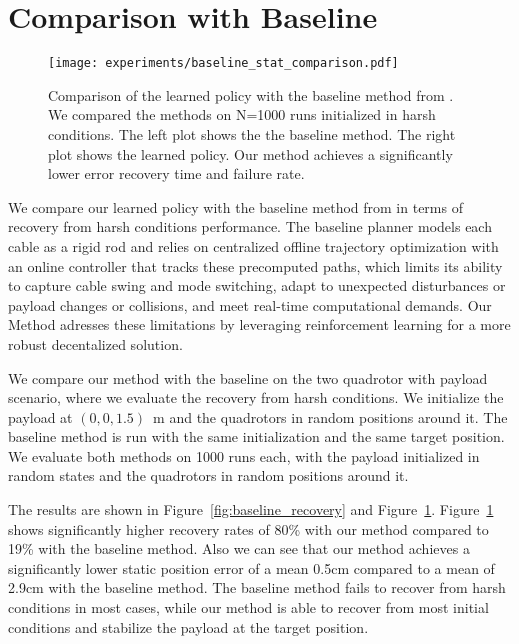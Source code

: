 \section{Comparison with Baseline}
\begin{figure}[H]
    \centering
    
    \texttt{[image: experiments/baseline\_stat\_comparison.pdf]}
    \caption[Baseline vs RL Performance]{Comparison of the learned policy with the baseline method from \autocite{Wahba2024}. We compared the methods on N=1000 runs initialized in harsh conditions. The left plot shows the the baseline method. The right plot shows the learned policy. Our method achieves a significantly lower error recovery time and failure rate.}
    \label{fig:baseline_histogram_comparison}

\end{figure}
We compare our learned policy with the baseline method from \autocite{Wahba2024} in terms of recovery from harsh conditions performance. The baseline planner models each cable as a rigid rod and relies on centralized offline trajectory optimization with an online controller that tracks these precomputed paths, which limits its ability to capture cable swing and mode switching, adapt to unexpected disturbances or payload changes or collisions, and meet real-time computational demands. Our Method adresses these limitations by leveraging reinforcement learning for a more robust decentalized solution.

We compare our method with the baseline on the two quadrotor with payload scenario, where we evaluate the recovery from harsh conditions. We initialize the payload at $(0,0,1.5)$~m and the quadrotors in random positions around it. The baseline method is run with the same initialization and the same target position. We evaluate both methods on 1000 runs each, with the payload initialized in random states and the quadrotors in random positions around it. 

The results are shown in Figure~\ref{fig:baseline_recovery} and Figure~\ref{fig:baseline_histogram_comparison}.
Figure~\ref{fig:baseline_histogram_comparison} shows significantly higher recovery rates of 80\% with our method compared to 19\% with the baseline method. Also we can see that our method achieves a significantly lower static position error of a mean 0.5cm compared to a mean of 2.9cm with the baseline method. The baseline method fails to recover from harsh conditions in most cases, while our method is able to recover from most initial conditions and stabilize the payload at the target position.

